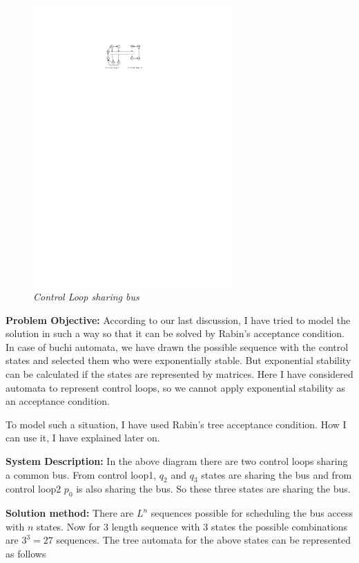 \documentclass[conference]{IEEEtran}
\begin{document}
\begin{figure}[h]
\begin{center}
\includegraphics[width=3.0in]{diagram.pdf}
\end{center}
\vspace{-0.1in}
\caption{{\em Control Loop sharing bus}}
\label{fig:automaton}
\end{figure}
{\textbf {Problem Objective:}} According to our last discussion, I have tried to model the solution in such
a way so that it can be solved by Rabin's acceptance condition. In case of buchi 
automata, we have drawn the possible sequence with the control states and selected 
them who were exponentially stable. But exponential stability can be calculated if
the states are represented by matrices. Here I have considered automata to represent
control loops, so we cannot apply exponential stability as an acceptance condition.

To model such a situation, I have used Rabin's tree acceptance condition. How I can
use it, I have explained later on.

{\textbf{System Description: }}In the above diagram there are two control loops sharing a common bus. From control loop1, 
$q_2$ and $q_3$ states are sharing the bus and from control loop2 $p_0$
is also sharing the bus. So these three states are sharing the bus. 

{\textbf{Solution method: }}There are $L^n$ sequences possible for scheduling the bus access with $n$ states.
Now for 3 length sequence with 3 states the possible combinations are $3^3 = 27$ 
sequences. The tree automata for the above states can be represented as follows
\end{document}
